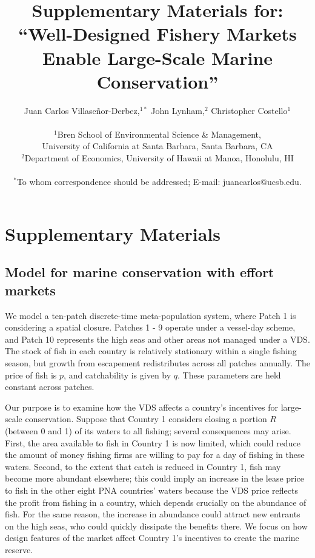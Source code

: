 \documentclass[12pt]{article}
\title{Supplementary Materials for: ``Well-Designed Fishery Markets Enable Large-Scale Marine Conservation''}
\author{Juan Carlos Villase\~{n}or-Derbez,$^{1\ast}$ John Lynham,$^{2}$ Christopher Costello$^{1}$\\
\\
\normalsize{$^{1}$Bren School of Environmental Science \& Management,}\\
\normalsize{University of California at Santa Barbara, Santa Barbara, CA}\\
\normalsize{$^{2}$Department of Economics, University of Hawaii at Manoa, Honolulu, HI}\\
\\
\normalsize{$^\ast$To whom correspondence should be addressed; E-mail: juancarlos@ucsb.edu.}
}
\date{}
\begin{document}

\baselineskip24pt


\maketitle


\newcommand{\beginsupplement}{\setcounter{table}{0}  \renewcommand{\thetable}{S\arabic{table}} \setcounter{figure}{0} \renewcommand{\thefigure}{S\arabic{figure}}}

\setcounter{table}{0}  \renewcommand{\thetable}{S\arabic{table}} \setcounter{figure}{0} \renewcommand{\thefigure}{S\arabic{figure}}

\section{Supplementary Materials}

\subsection{Model for marine conservation with effort markets}

We model a ten-patch discrete-time meta-population system, where Patch 1 is considering a spatial closure. Patches 1 - 9 operate under a vessel-day scheme, and Patch 10 represents the high seas and other areas not managed under a VDS. The stock of fish in each country is relatively stationary within a single fishing season, but  growth from escapement redistributes across all patches annually. The price of fish is $p$, and catchability is given by $q$. These parameters are held constant across patches.

Our purpose is to examine how the VDS affects a country's incentives for large-scale conservation. Suppose that Country 1 considers closing a portion $R$ (between 0 and 1) of its waters to all fishing; several consequences may arise. First, the area available to fish in Country 1 is now limited, which could reduce the amount of money fishing firms are willing to pay for a day of fishing in these waters. Second, to the extent that catch is reduced in Country 1, fish may become more abundant elsewhere; this could imply an increase in the lease price to fish in the other eight PNA countries' waters because the VDS price reflects the profit from fishing in a country, which depends crucially on the abundance of fish. For the same reason, the increase in abundance could attract new entrants on the high seas, who could quickly dissipate the benefits there. We focus on how design features of the market affect Country 1's incentives to create the marine reserve.
\end{document}

